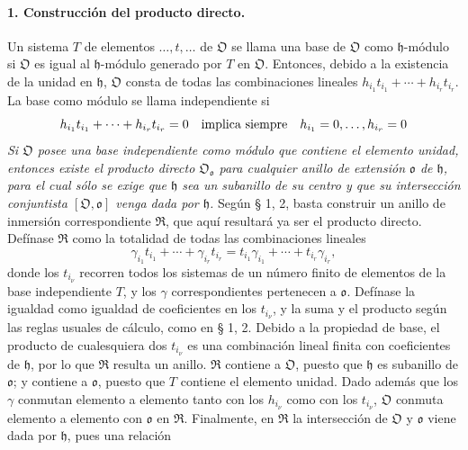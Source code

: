 \paragraph{1. Construcción del producto directo.}
Un sistema $T$ de elementos $\ldots,t,\ldots$ de $\mathfrak O$ se llama una base de $\mathfrak O$ como $\mathfrak h$-módulo si $\mathfrak O$ es igual al $\mathfrak h$-módulo generado por $T$ en $\mathfrak O$. Entonces, debido a la existencia de la unidad en $\mathfrak h$, $\mathfrak O$ consta de todas las combinaciones lineales $h_{i_1}t_{i_1}+\cdots+h_{i_r}t_{i_r}$. La base como módulo se llama independiente si
\[
h_{i_1}t_{i_1}+\cdots+h_{i_r}t_{i_r}=0
\quad\hbox{implica siempre}\quad
h_{i_1}=0,\ldots,h_{i_r}=0
\]
\emph{Si $\mathfrak O$ posee una base independiente como módulo que contiene el elemento unidad, entonces existe el producto directo $\mathfrak O_{\mathfrak o}$ para cualquier anillo de extensión $\mathfrak o$ de $\mathfrak h$, para el cual sólo se exige que $\mathfrak h$ sea un subanillo de su centro y que su intersección conjuntista $[\mathfrak O,\mathfrak o]$ venga dada por $\mathfrak h$.} Según § 1, 2, basta construir un anillo de inmersión correspondiente $\mathfrak R$, que aquí resultará ya ser el producto directo. Defínase $\mathfrak R$ como la totalidad de todas las combinaciones lineales
\[
\gamma_{i_1}t_{i_1}+\cdots+\gamma_{i_r}t_{i_r}
=t_{i_1}\gamma_{i_1}+\cdots+t_{i_r}\gamma_{i_r},
\]
donde los $t_{i_\nu}$ recorren todos los sistemas de un número finito de elementos de la base independiente $T$, y los $\gamma$ correspondientes pertenecen a $\mathfrak o$. Defínase la igualdad como igualdad de coeficientes en los $t_{i_\nu}$, y la suma y el producto según las reglas usuales de cálculo, como en § 1, 2. Debido a la propiedad de base, el producto de cualesquiera dos $t_{i_\nu}$ es una combinación lineal finita con coeficientes de $\mathfrak h$, por lo que $\mathfrak R$ resulta un anillo. $\mathfrak R$ contiene a $\mathfrak O$, puesto que $\mathfrak h$ es subanillo de $\mathfrak o$; y contiene a $\mathfrak o$, puesto que $T$ contiene el elemento unidad. Dado además que los $\gamma$ conmutan elemento a elemento tanto con los $h_{i_\nu}$ como con los $t_{i_\nu}$, $\mathfrak O$ conmuta elemento a elemento con $\mathfrak o$ en $\mathfrak R$. Finalmente, en $\mathfrak R$ la intersección de $\mathfrak O$ y $\mathfrak o$ viene dada por $\mathfrak h$, pues una relación
